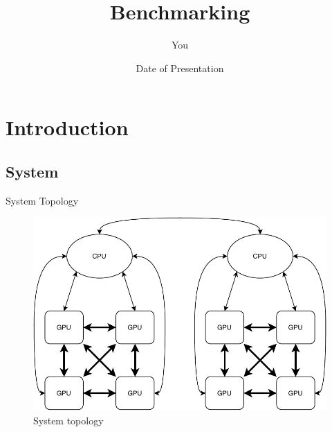 \documentclass[aspectratio=169]{beamer}
\title[Your Short Title]{Benchmarking}
\author{You}
\date{Date of Presentation}
\begin{document}
\begin{frame}
  \titlepage
\end{frame}

\section{Introduction}

\subsection{System}
\begin{frame}{System Topology}
\begin{figure}
    \centering
    \includegraphics[height=.75\textheight]{figs/kleurplaat-topology.pdf}
    \caption{System topology}
    \label{fig:topology}
\end{figure}
    
\end{frame}
\end{document}
